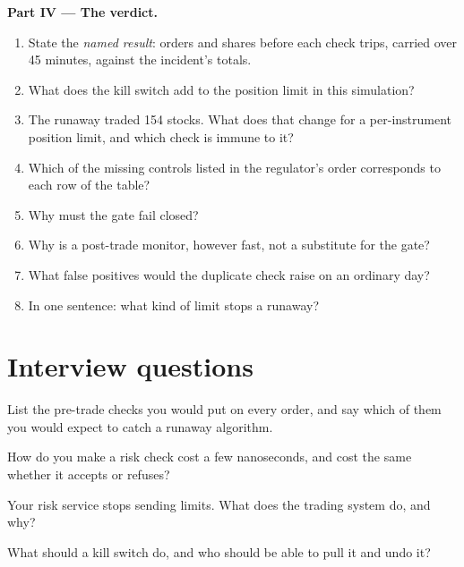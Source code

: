 \begin{problem}
\medskip\noindent\textbf{Part IV --- The verdict.}
\begin{enumerate}[resume]
\item State the \emph{named result}: orders and shares before each check trips, carried over 45 minutes, against the
incident's totals.
\item What does the kill switch add to the position limit in this simulation?
\item The runaway traded 154 stocks. What does that change for a per-instrument position limit, and which check is immune to it?
\item Which of the missing controls listed in the regulator's order corresponds to each row of the table?
\item Why must the gate fail closed?
\item Why is a post-trade monitor, however fast, not a substitute for the gate?
\item What false positives would the duplicate check raise on an ordinary day?
\item In one sentence: what kind of limit stops a runaway?
\end{enumerate}
\end{problem}

\section{Interview questions}

\begin{interviewq}\label{iq:ll:pre-trade-risk-and-kill-switches:1}
List the pre-trade checks you would put on every order, and say which of them you would expect to catch a runaway algorithm.
\end{interviewq}

\begin{interviewq}\label{iq:ll:pre-trade-risk-and-kill-switches:2}
How do you make a risk check cost a few nanoseconds, and cost the same whether it accepts or refuses?
\end{interviewq}

\begin{interviewq}\label{iq:ll:pre-trade-risk-and-kill-switches:3}
Your risk service stops sending limits. What does the trading system do, and why?
\end{interviewq}

\begin{interviewq}\label{iq:ll:pre-trade-risk-and-kill-switches:4}
What should a kill switch do, and who should be able to pull it and undo it?
\end{interviewq}


